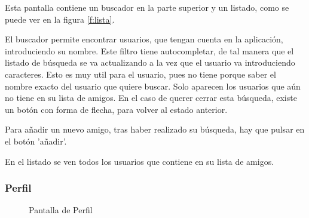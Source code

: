 \documentclass[a4paper, 12pt]{book}
\begin{document}
Esta pantalla contiene un buscador en la parte superior y un listado, como se puede ver en
la figura \ref{f:lista}.

El buscador permite encontrar usuarios, que tengan cuenta en la aplicaci\'on, introduciendo
su nombre. Este filtro tiene autocompletar, de tal manera que el listado de b\'usqueda se va actualizando
a la vez que el usuario va introduciendo caracteres. Esto es muy util para el usuario,
pues no tiene porque saber el nombre exacto del usuario que quiere buscar. Solo aparecen los
usuarios que a\'un no tiene en su lista de amigos. En el caso de querer cerrar esta b\'usqueda,
existe un bot\'on con forma de flecha, para volver al estado anterior.

Para a\~nadir un nuevo amigo, tras haber realizado su b\'usqueda, hay que pulsar en el bot\'on
'a\~nadir'.

En el listado se ven todos los usuarios que contiene en su lista de amigos.


\subsubsection{Perfil}
\label{sec:perfil}

\begin{figure}[H]
 \centering
 \caption{Pantalla de Perfil}
 \label{f:perfil}
\end{figure}
\end{document}
